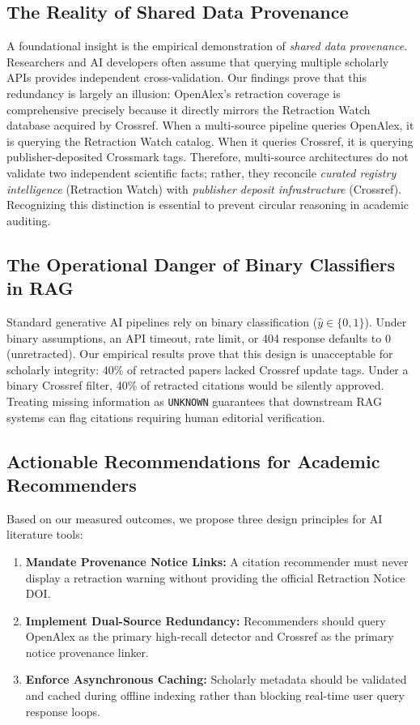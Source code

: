 \documentclass[10pt,a4paper,twocolumn]{article}
\begin{document}
\subsection{The Reality of Shared Data Provenance}
A foundational insight is the empirical demonstration of \emph{shared data provenance}. Researchers and AI developers often assume that querying multiple scholarly APIs provides independent cross-validation. Our findings prove that this redundancy is largely an illusion: OpenAlex's retraction coverage is comprehensive precisely because it directly mirrors the Retraction Watch database acquired by Crossref.
When a multi-source pipeline queries OpenAlex, it is querying the Retraction Watch catalog. When it queries Crossref, it is querying publisher-deposited Crossmark tags. Therefore, multi-source architectures do not validate two independent scientific facts; rather, they reconcile \emph{curated registry intelligence} (Retraction Watch) with \emph{publisher deposit infrastructure} (Crossref). Recognizing this distinction is essential to prevent circular reasoning in academic auditing.

\subsection{The Operational Danger of Binary Classifiers in RAG}
Standard generative AI pipelines rely on binary classification ($\hat{y} \in \{0, 1\}$). Under binary assumptions, an API timeout, rate limit, or 404 response defaults to $0$ (unretracted). Our empirical results prove that this design is unacceptable for scholarly integrity: 40\% of retracted papers lacked Crossref update tags. Under a binary Crossref filter, 40\% of retracted citations would be silently approved. Treating missing information as \texttt{UNKNOWN} guarantees that downstream RAG systems can flag citations requiring human editorial verification.

\subsection{Actionable Recommendations for Academic Recommenders}
Based on our measured outcomes, we propose three design principles for AI literature tools:
\begin{enumerate}
    \item \textbf{Mandate Provenance Notice Links:} A citation recommender must never display a retraction warning without providing the official Retraction Notice DOI.
    \item \textbf{Implement Dual-Source Redundancy:} Recommenders should query OpenAlex as the primary high-recall detector and Crossref as the primary notice provenance linker.
    \item \textbf{Enforce Asynchronous Caching:} Scholarly metadata should be validated and cached during offline indexing rather than blocking real-time user query response loops.
\end{enumerate}
\end{document}
